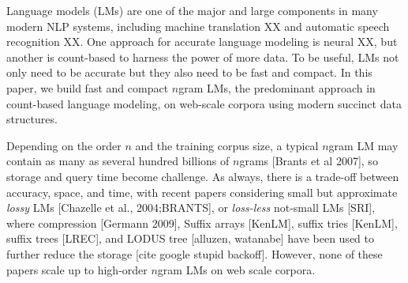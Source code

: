 Language models (LMs) are one of the major and large components in many modern NLP systems, including machine translation XX and automatic speech recognition XX.
%
One approach for accurate language modeling is neural XX, but another is  count-based to harness the power of more data.
%
%
To be useful, LMs not only need to be accurate but they also need to be fast and compact.
%
In this paper, we build  fast and compact $n$gram LMs, the predominant approach in count-based language modeling, on web-scale corpora using modern succinct data structures.

%
%



Depending on the order $n$ and the training corpus size, a typical $n$gram LM may contain as many as several hundred billions of $n$grams [Brants et al 2007],
so storage and query time become challenge.
%
As always, there is a trade-off between accuracy, space, and time, with recent papers considering small but approximate  \emph{lossy} LMs [Chazelle et al., 2004;BRANTS],
or \emph{loss-less}  not-small LMs [SRI], where compression [Germann 2009], Suffix arrays [KenLM], suffix tries [KenLM], suffix trees [LREC], and LODUS tree [alluzen, watanabe]  have been used to further reduce the storage [cite google stupid backoff].
% 
However, none of these papers scale up to high-order  
$n$gram LMs on web scale corpora. 

